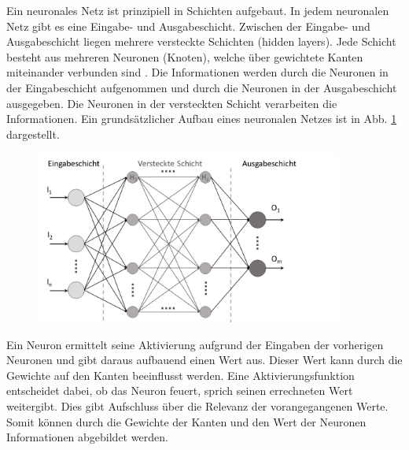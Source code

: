 Ein neuronales Netz ist prinzipiell in Schichten aufgebaut.
In jedem neuronalen Netz gibt es eine Eingabe- und Ausgabeschicht.
Zwischen der Eingabe- und Ausgabeschicht liegen mehrere versteckte Schichten (hidden layers).
Jede Schicht besteht aus mehreren Neuronen (Knoten), welche über gewichtete Kanten miteinander verbunden sind \autocite[vgl.][S. 26]{sonnet_neuronale_2022}.
Die Informationen werden durch die Neuronen in der Eingabeschicht aufgenommen und durch die Neuronen in der Ausgabeschicht ausgegeben.
Die Neuronen in der versteckten Schicht verarbeiten die Informationen.
Ein grundsätzlicher Aufbau eines neuronalen Netzes ist in Abb. \ref{fig:StructureNN} dargestellt.
\begin{figure}[H]
    \centering
    \includegraphics[width=0.9\textwidth]{images/structure_NN.png}
    \label{fig:StructureNN}
\end{figure}\noindent
Ein Neuron ermittelt seine Aktivierung aufgrund der Eingaben der vorherigen Neuronen und gibt daraus aufbauend einen Wert aus.
Dieser Wert kann durch die Gewichte auf den Kanten beeinflusst werden.
Eine Aktivierungsfunktion entscheidet dabei, ob das Neuron feuert, sprich seinen errechneten Wert weitergibt.
Dies gibt Aufschluss über die Relevanz der vorangegangenen Werte.
Somit können durch die Gewichte der Kanten und den Wert der Neuronen Informationen abgebildet werden.
\autocite[vgl.][S. 27]{sonnet_neuronale_2022}

